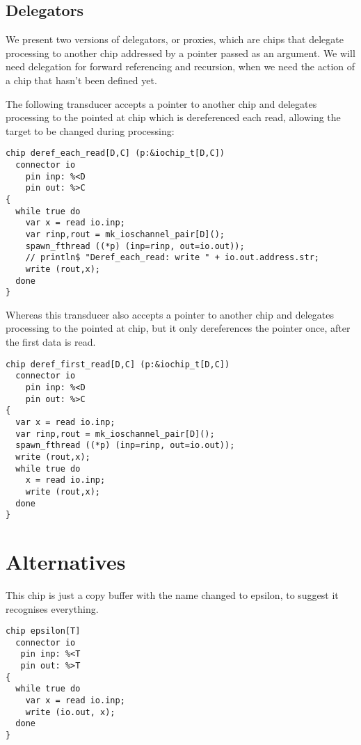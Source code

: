 \documentclass[oneside]{book}
\begin{document}
\subsection{Delegators}
We present two versions of delegators, or proxies, which are chips that delegate
processing to another chip addressed by a pointer passed as an argument.
We will need delegation for forward referencing and recursion, when we need
the action of a chip that hasn't been defined yet.

The following transducer accepts a pointer to another chip and delegates
processing to the pointed at chip which is dereferenced each read,
allowing the target to be changed during processing:

\begin{verbatim}
chip deref_each_read[D,C] (p:&iochip_t[D,C]) 
  connector io
    pin inp: %<D
    pin out: %>C
{
  while true do
    var x = read io.inp;
    var rinp,rout = mk_ioschannel_pair[D]();
    spawn_fthread ((*p) (inp=rinp, out=io.out));
    // println$ "Deref_each_read: write " + io.out.address.str;
    write (rout,x);
  done
}
\end{verbatim}

Whereas this transducer also accepts a pointer to another chip
and delegates processing to the pointed at chip, but it only
dereferences the pointer once, after the first data is read.

\begin{verbatim}
chip deref_first_read[D,C] (p:&iochip_t[D,C]) 
  connector io
    pin inp: %<D
    pin out: %>C
{
  var x = read io.inp;
  var rinp,rout = mk_ioschannel_pair[D]();
  spawn_fthread ((*p) (inp=rinp, out=io.out));
  write (rout,x);
  while true do
    x = read io.inp;
    write (rout,x);
  done
}
\end{verbatim}

\section{Alternatives}
This chip is just a copy buffer with the name changed to epsilon, 
to suggest it recognises everything.

\begin{verbatim}
chip epsilon[T]
  connector io
   pin inp: %<T
   pin out: %>T
{
  while true do
    var x = read io.inp;
    write (io.out, x);
  done
}
\end{verbatim}
\end{document}
